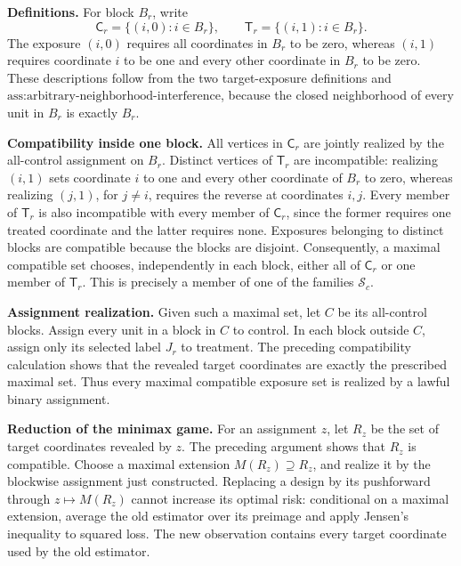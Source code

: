 \textbf{Definitions.} For block \(B_r\), write
\[
\mathsf C_r=\{(i,0):i\in B_r\},
\qquad
\mathsf T_r=\{(i,1):i\in B_r\}.
\]
The exposure \((i,0)\) requires all coordinates in \(B_r\) to be zero, whereas \((i,1)\) requires coordinate \(i\) to be one and every other coordinate in \(B_r\) to be zero. These descriptions follow from the two target-exposure definitions and \(\text{ass:arbitrary-neighborhood-interference}\), because the closed neighborhood of every unit in \(B_r\) is exactly \(B_r\).

\textbf{Compatibility inside one block.} All vertices in \(\mathsf C_r\) are jointly realized by the all-control assignment on \(B_r\). Distinct vertices of \(\mathsf T_r\) are incompatible: realizing \((i,1)\) sets coordinate \(i\) to one and every other coordinate of \(B_r\) to zero, whereas realizing \((j,1)\), for \(j\ne i\), requires the reverse at coordinates \(i,j\). Every member of \(\mathsf T_r\) is also incompatible with every member of \(\mathsf C_r\), since the former requires one treated coordinate and the latter requires none. Exposures belonging to distinct blocks are compatible because the blocks are disjoint. Consequently, a maximal compatible set chooses, independently in each block, either all of \(\mathsf C_r\) or one member of \(\mathsf T_r\). This is precisely a member of one of the families \(\mathcal S_c\).

\textbf{Assignment realization.} Given such a maximal set, let \(C\) be its all-control blocks. Assign every unit in a block in \(C\) to control. In each block outside \(C\), assign only its selected label \(J_r\) to treatment. The preceding compatibility calculation shows that the revealed target coordinates are exactly the prescribed maximal set. Thus every maximal compatible exposure set is realized by a lawful binary assignment.

\textbf{Reduction of the minimax game.} For an assignment \(z\), let \(R_z\) be the set of target coordinates revealed by \(z\). The preceding argument shows that \(R_z\) is compatible. Choose a maximal extension \(M(R_z)\supseteq R_z\), and realize it by the blockwise assignment just constructed. Replacing a design by its pushforward through \(z\mapsto M(R_z)\) cannot increase its optimal risk: conditional on a maximal extension, average the old estimator over its preimage and apply Jensen's inequality to squared loss. The new observation contains every target coordinate used by the old estimator.

